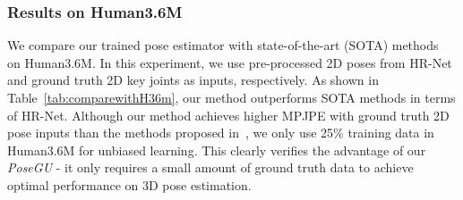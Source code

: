\documentclass[runningheads]{llncs}
\begin{document}
\begin{table}[h]
	\small
	\centering
	\caption{\textbf{Results on Human3.6M} in terms of average MPJPE. HR denotes 2D poses from HR-Net as inputs and GT denotes the ground truth 2D key joints. Best results are shown in \textbf{bold}.}
	\label{tab:comparewithH36m}
\end{table} 

\subsubsection{Results on Human3.6M} 
We compare our trained pose estimator with state-of-the-art (SOTA) methods~\cite{adver2,stateofart-sharma,semigcn,stateofart-moon2019camera,aug1,poseaug} on Human3.6M. 
In this experiment, we use pre-processed 2D poses from HR-Net~\cite{HR-Net} and ground truth 2D key joints as inputs, respectively. 
As shown in Table~\ref{tab:comparewithH36m}, our method outperforms SOTA methods in terms of HR-Net. 
Although our method achieves higher MPJPE with ground truth 2D pose inputs than the methods proposed in~\cite{aug1,stateofart-moon2019camera}, we only use 25\% training data in Human3.6M for unbiased learning. 
This clearly verifies the advantage of our \textit{PoseGU} - it only requires a small amount of ground truth data to achieve optimal performance on 3D pose estimation. 
\end{document}
